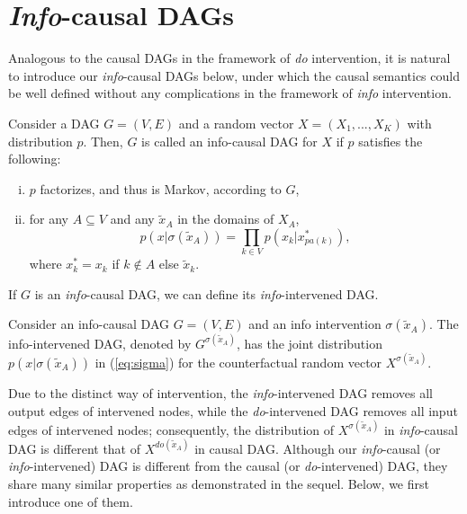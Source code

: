 

\section{\emph{Info}-causal DAGs}

Analogous to the causal DAGs in the framework of 
\emph{do} intervention, it is natural to introduce our \emph{info}-causal DAGs below, under which the causal semantics  could be well defined without any complications in the framework of \emph{info} intervention. 



\begin{Def}
	Consider a DAG $G = (V, E)$ and a random vector $X = (X_1, ..., X_K)$ with distribution $p$. Then, $G$ is called an info-causal DAG for $X$ if $p$ satisfies the following:
	\begin{enumerate}[(i)]
		\setlength{\itemsep}{0pt}
		\item $p$ factorizes, and thus is Markov, according to $G$,  
		\item for any $A \subseteq V$ and any $\tilde{x}_A$ in the domains of $X_A$,
		\begin{equation}\label{eq:sigma}
			p(x| \sigma(\tilde{x}_A)) = \prod_{k \in V} p(x_k|x_{pa(k)}^*),
		\end{equation}		
		where $x^*_k = x_k$ if $k \notin A$ else $\tilde{x}_k$.
	\end{enumerate}
\end{Def}

If $G$ is an \emph{info}-causal DAG, we can define its \emph{info}-intervened DAG.


\begin{Def}
	Consider an info-causal DAG $G = (V, E)$ and an info intervention $\sigma(\tilde{x}_A)$. The info-intervened DAG, denoted by $G^{\sigma(\tilde{x}_A)}$, has the joint distribution $p(x| \sigma(\tilde{x}_A))$ in (\ref{eq:sigma}) for the 
	counterfactual random vector $X^{\sigma(\tilde{x}_A)}$. 
\end{Def}

Due to the distinct way of intervention,  
the \emph{info}-intervened DAG removes all output edges of intervened nodes, while the \emph{do}-intervened DAG removes all input edges of intervened nodes; consequently, 
the distribution of $X^{\sigma(\tilde{x}_A)}$ in \emph{info}-causal DAG is different that of 
$X^{do(\tilde{x}_A)}$ in causal DAG. Although our 
\emph{info}-causal (or \emph{info}-intervened) DAG is different from the causal (or \emph{do}-intervened) DAG, 
they share many similar properties as demonstrated in the sequel. Below, we first introduce one of them.



